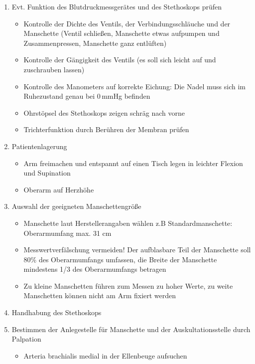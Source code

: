 \begin{enumerate}
    \item Evt. Funktion des Blutdruckmessger\"ates und des Stethoskops pr\"ufen
    \begin{itemize}
        \item Kontrolle der Dichte des Ventils, der Verbindungsschl\"auche und
        der Manschette (Ventil schlie{\ss}en, Manschette etwas aufpumpen und
        Zusammenpressen, Manschette ganz entl\"uften)
        \item Kontrolle der G\"angigkeit des Ventils (es soll sich leicht auf
        und zuschrauben lassen)
        \item Kontrolle des Manometers auf korrekte Eichung: Die Nadel muss sich
        im Ruhezustand genau bei 0\,mmHg befinden
        \item Ohrst\"opsel des Stethoskops zeigen schr\"ag nach vorne
        \item Trichterfunktion durch Ber\"uhren der Membran pr\"ufen
    \end{itemize}
    \item Patientenlagerung
    \begin{itemize}
        \item Arm freimachen und entspannt auf einen Tisch legen in leichter
        Flexion und Supination
        \item Oberarm auf Herzh\"ohe
    \end{itemize}
    \item Auswahl der geeigneten Manschettengr\"o{\ss}e
    \begin{itemize}
        \item Manschette laut Herstellerangaben w\"ahlen z.B Standardmanschette:
        Oberarmumfang max. 31 cm
        \item Messwertverf\"alschung vermeiden! Der aufblasbare Teil der
        Manschette soll 80\% des Oberarmumfangs umfassen, die Breite der
        Manschette mindestens 1/3 des Oberarmumfangs betragen
        \item Zu kleine Manschetten f\"uhren zum Messen zu hoher Werte, zu weite
        Manschetten k\"onnen nicht am Arm fixiert werden
    \end{itemize}
    \item Handhabung des Stethoskops
    \item Bestimmen der Anlegestelle f\"ur Manschette und der
    Auskultationsstelle durch Palpation
    \begin{itemize}
        \item Arteria brachialis medial in der Ellenbeuge aufsuchen
    \end{itemize}
    

\end{enumerate}
